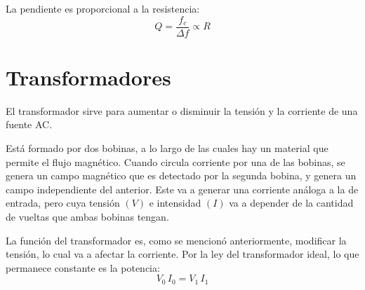 \begin{center}
    \def\svgwidth{0.6\linewidth}
    
\end{center}

La pendiente es proporcional a la resistencia:
\begin{equation*}
    Q = \frac{f_c}{\Delta f} \propto R
\end{equation*}


\section{Transformadores}

El transformador sirve para aumentar o disminuir la tensión y la corriente de una fuente AC.

Está formado por dos bobinas, a lo largo de las cuales hay un material que permite el flujo magnético.
Cuando circula corriente por una de las bobinas, se genera un campo magnético que es detectado por la segunda bobina, y genera un campo independiente del anterior.
Este va a generar una corriente análoga a la de entrada, pero cuya tensión $(V)$ e intensidad $(I)$ va a depender de la cantidad de vueltas que ambas bobinas tengan.

\begin{center}
    \def\svgwidth{\linewidth}
    
\end{center}

La función del transformador es, como se mencionó anteriormente, modificar la tensión, lo cual va a afectar la corriente.
Por la ley del transformador ideal, lo que permanece constante es la potencia:
\begin{equation*}
    V_0 \, I_0 = V_1 \, I_1
\end{equation*}

